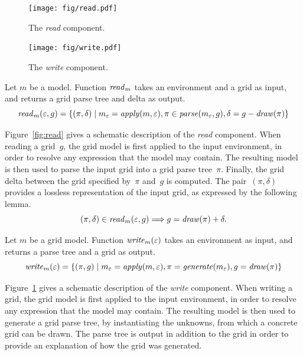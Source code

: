 \documentclass[a4paper]{llncs}
\begin{document}
\begin{figure}[t]
  \centering
  \begin{minipage}[b]{0.55\textwidth}
    \centering
    \texttt{[image: fig/read.pdf]}
    \caption{The {\em read} component.}
    \label{fig:read}
  \end{minipage}
  \hfill
  \begin{minipage}[b]{0.44\textwidth}
    \centering
    \texttt{[image: fig/write.pdf]}
    \caption{The {\em write} component.}
    \label{fig:write}
  \end{minipage}
\end{figure}

\begin{definition}
  Let $m$ be a model. Function ${\it read}_m$ takes an environment and
  a grid as input, and returns a grid parse tree and delta as output.
  \[ {\it read}_m(\varepsilon,g) = \{ (\pi,\delta) \mid m_\varepsilon
    = {\it apply}(m,\varepsilon), \pi \in {\it
      parse}(m_\varepsilon,g), \delta = g - {\it draw}(\pi) \} \]
\end{definition}

Figure~\ref{fig:read} gives a schematic description of the {\em read}
component. When reading a grid~$g$, the grid model is first applied to
the input environment, in order to resolve any expression that the
model may contain. The resulting model is then used to parse the input
grid into a grid parse tree~$\pi$. Finally, the grid delta between the
grid specified by~$\pi$ and~$g$ is computed. The pair~$(\pi,\delta)$
provides a lossless representation of the input grid, as expressed by
the following lemma.
\[ (\pi,\delta) \in {\it read}_m(\varepsilon,g) \Longrightarrow g =
  {\it draw}(\pi) + \delta. \] %


\begin{definition}
  Let $m$ be a grid model. Function ${\it write}_m(\varepsilon)$ takes
  an environment as input, and returns a parse tree and a grid as
  output.
  \[ {\it write}_m(\varepsilon) = \{ (\pi,g) \mid m_\varepsilon = {\it
      apply}(m,\varepsilon), \pi = {\it generate}(m_\varepsilon), g =
    {\it draw}(\pi) \} \]
\end{definition}

Figure~\ref{fig:write} gives a schematic description of the {\em
  write} component. When writing a grid, the grid model is first
applied to the input environment, in order to resolve any expression
that the model may contain. The resulting model is then used to
generate a grid parse tree, by instantiating the unknowns, from which
a concrete grid can be drawn. The parse tree is output in addition to
the grid in order to provide an explanation of how the grid was
generated.
\end{document}
